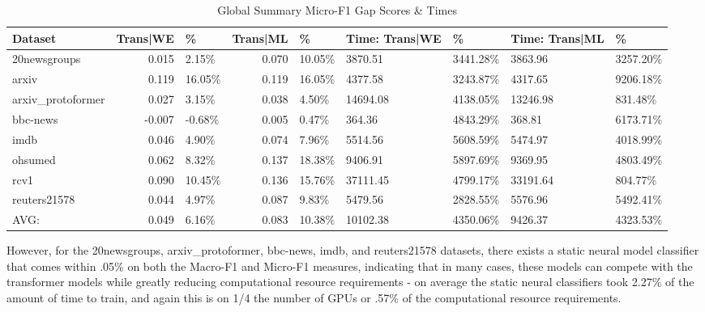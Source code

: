 \documentclass[final]{clv2025}
\begin{document}
\begin{table}[h!]
\centering
\scriptsize
\caption{Global Summary Micro-F1 Gap Scores \& Times}
\label{tab:micro_f1_gap_summary}
\begin{tabular}{@{}p{1.3cm} r p{1cm} r p{1cm} p{1cm} p{1cm} p{1cm} p{1.1cm}@{}}
\toprule
\textbf{Dataset} & \textbf{Trans|WE} & \textbf{\%} & \textbf{Trans|ML} & \textbf{\%} & \textbf{Time: Trans|WE} & \textbf{\%} & \textbf{Time: Trans|ML} & \textbf{\%} \\
\midrule
20newsgroups      & 0.015 & 2.15\%  & 0.070 & 10.05\% & 3870.51 & 3441.28\% & 3863.96 & 3257.20\% \\
arxiv             & 0.119 & 16.05\% & 0.119 & 16.05\% & 4377.58 & 3243.87\% & 4317.65 & 9206.18\% \\
arxiv\_protoformer& 0.027 & 3.15\%  & 0.038 & 4.50\%  & 14694.08 & 4138.05\% & 13246.98 & 831.48\% \\
bbc-news          & -0.007 & -0.68\% & 0.005 & 0.47\% & 364.36 & 4843.29\% & 368.81 & 6173.71\% \\
imdb              & 0.046 & 4.90\%  & 0.074 & 7.96\%  & 5514.56 & 5608.59\% & 5474.97 & 4018.99\% \\
ohsumed           & 0.062 & 8.32\%  & 0.137 & 18.38\% & 9406.91 & 5897.69\% & 9369.95 & 4803.49\% \\
rcv1              & 0.090 & 10.45\% & 0.136 & 15.76\% & 37111.45 & 4799.17\% & 33191.64 & 804.77\% \\
\midrule
reuters21578      & 0.044 & 4.97\%  & 0.087 & 9.83\%  & 5479.56 & 2828.55\% & 5576.96 & 5492.41\% \\
AVG:              & 0.049 & 6.16\%  & 0.083 & 10.38\% & 10102.38 & 4350.06\% & 9426.37 & 4323.53\% \\
\bottomrule
\end{tabular}
\end{table}


However, for the 20newsgroups, arxiv\_protoformer, bbc-news, imdb, and reuters21578 datasets, there exists a static neural model classifier that comes within .05\% on both the Macro-F1 and Micro-F1 measures, indicating that in many cases, these models can compete with the transformer models while greatly reducing computational resource requirements - on average the static neural classifiers took 2.27\% of the amount of time to train, and again this is on 1/4 the number of GPUs or .57\% of the computational resource requirements.
\end{document}
